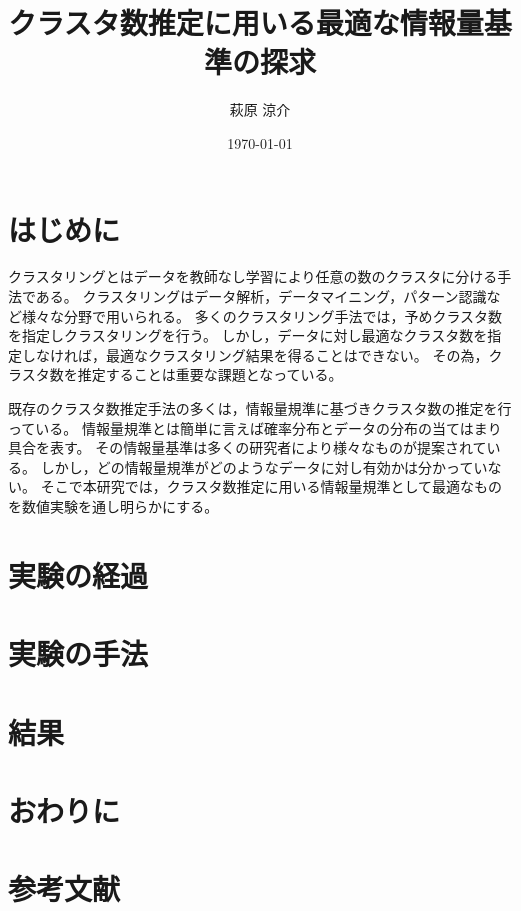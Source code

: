 \documentclass[10pt,a4j,twocolumn]{ltjsarticle}
\author{萩原 涼介}
\title{クラスタ数推定に用いる最適な情報量基準の探求}
\date{\today}
\begin{document}
\maketitle
\section{はじめに}
クラスタリングとはデータを教師なし学習により任意の数のクラスタに分ける手法である。
クラスタリングはデータ解析，データマイニング，パターン認識など様々な分野で用いられる。
多くのクラスタリング手法では，予めクラスタ数を指定しクラスタリングを行う。
しかし，データに対し最適なクラスタ数を指定しなければ，最適なクラスタリング結果を得ることはできない。
その為，クラスタ数を推定することは重要な課題となっている。

既存のクラスタ数推定手法の多くは，情報量規準に基づきクラスタ数の推定を行っている。
情報量規準とは簡単に言えば確率分布とデータの分布の当てはまり具合を表す。
その情報量基準は多くの研究者により様々なものが提案されている。
しかし，どの情報量規準がどのようなデータに対し有効かは分かっていない。
そこで本研究では，クラスタ数推定に用いる情報量規準として最適なものを数値実験を通し明らかにする。

\section{実験の経過}

\section{実験の手法}

\section{結果}

\section{おわりに}

\section*{参考文献}
\end{document}
